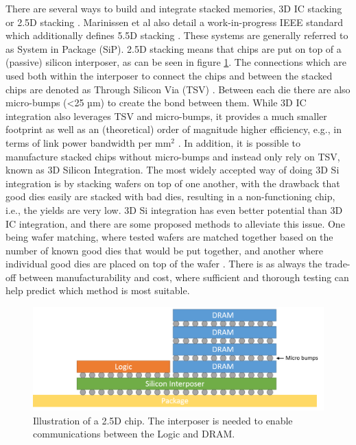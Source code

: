 There are several ways to build and integrate stacked memories, 3D IC stacking or 2.5D stacking \cite{6248905, 5702702, 6248842}. Marinissen et al also detail a work-in-progress IEEE standard which additionally defines 5.5D stacking \cite{7519330}. These systems are generally referred to as System in Package (SiP). 2.5D stacking means that chips are put on top of a (passive) silicon interposer, as can be seen in figure \ref{2D-chip}. The connections which are used both within the interposer to connect the chips and between the stacked chips are denoted as Through Silicon Via (TSV) \cite{Lau2018, lau2012through}. Between each die there are also micro-bumps (<25 µm) to create the bond between them. While 3D IC integration also leverages TSV and micro-bumps, it provides a much smaller footprint as well as an (theoretical) order of magnitude higher efficiency, e.g., in terms of link power bandwidth per mm$^{2}$ \cite{6248968}. In addition, it is possible to manufacture stacked chips without micro-bumps and instead only rely on TSV, known as 3D Silicon Integration. The most widely accepted way of doing 3D Si integration is by stacking wafers on top of one another, with the drawback that good dies easily are stacked with bad dies, resulting in a non-functioning chip, i.e., the yields are very low. 3D Si integration has even better potential than 3D IC integration, and there are some proposed methods to alleviate this issue. One being wafer matching, where tested wafers are matched together based on the number of known good dies that would be put together, and another where individual good dies are placed on top of the wafer \cite{Taouil:2010:TCA:1931472.1931973}. There is as always the trade-off between manufacturability and cost, where sufficient and thorough testing can help predict which method is most suitable.

\begin{figure}[!ht]
\centering
\includegraphics[width=0.75\linewidth]{figure/2D-integration.png}
\caption{Illustration of a 2.5D chip. The interposer is needed to enable communications between the Logic and DRAM. }
\label{2D-chip}
\end{figure}

